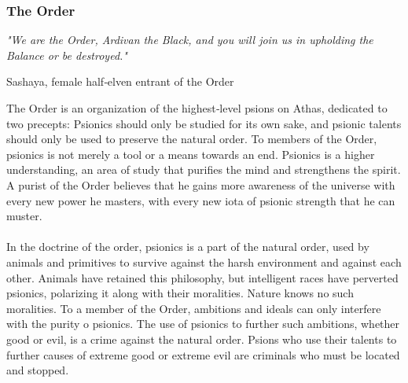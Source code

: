 \begin{multicols}{2}
\subsubsection{The Order}
\epigraph{\textit{
"We are the Order, Ardivan the Black, and you will join
us in upholding the Balance or be destroyed." }}
{ Sashaya, female half‐elven entrant of the Order }

The Order is an organization of the highest‐level
psions on Athas, dedicated to two precepts: Psionics
should only be studied for its own sake, and psionic
talents should only be used to preserve the natural order.
To members of the Order, psionics is not merely a tool
or a means towards an end. Psionics is a higher
understanding, an area of study that purifies the mind
and strengthens the spirit. A purist of the Order believes
that he gains more awareness of the universe with every
new power he masters, with every new iota of psionic
strength that he can muster.\\
\\
In the doctrine of the order, psionics is a part of the
natural order, used by animals and primitives to survive
against the harsh environment and against each other.
Animals have retained this philosophy, but intelligent
races have perverted psionics, polarizing it along with
their moralities. Nature knows no such moralities. To a
member of the Order, ambitions and ideals can only
interfere with the purity o psionics. The use of psionics to
further such ambitions, whether good or evil, is a crime
against the natural order. Psions who use their talents to
further causes of extreme good or extreme evil are
criminals who must be located and stopped.\\


\end{multicols}
